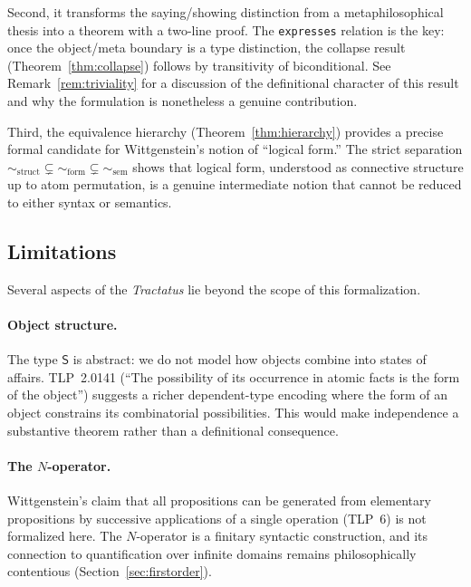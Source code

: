 \documentclass[10pt, letterpaper]{article}
\theoremstyle{definition}
\theoremstyle{remark}
\newcommand{\Sach}{\mathsf{S}}
\newcommand{\structEq}{\sim_{\mathrm{struct}}}
\newcommand{\formEq}{\sim_{\mathrm{form}}}
\newcommand{\semEq}{\sim_{\mathrm{sem}}}
\begin{document}
Second, it transforms the saying/showing distinction from a
metaphilosophical thesis into a theorem with a two-line proof.
The \texttt{expresses} relation is the key: once the
object/meta boundary is a type distinction, the collapse result
(Theorem~\ref{thm:collapse}) follows by transitivity of
biconditional.  See Remark~\ref{rem:triviality} for a
discussion of the definitional character of this result and
why the formulation is nonetheless a genuine contribution.

Third, the equivalence hierarchy (Theorem~\ref{thm:hierarchy})
provides a precise formal candidate for Wittgenstein's
notion of ``logical form.''  The strict separation $\structEq
\subsetneq \formEq \subsetneq \semEq$ shows that logical form,
understood as connective structure up to atom permutation, is a
genuine intermediate notion that cannot be reduced to either
syntax or semantics.

\subsection{Limitations}
\label{sec:limitations}

Several aspects of the \emph{Tractatus} lie beyond the scope of
this formalization.

\paragraph{Object structure.}
The type $\Sach$ is abstract: we do not model how objects combine
into states of affairs.  TLP~2.0141 (``The possibility of its
occurrence in atomic facts is the form of the object'') suggests
a richer dependent-type encoding where the form of an object
constrains its combinatorial possibilities.  This would make
independence a substantive theorem rather than a definitional
consequence.

\paragraph{The $N$-operator.}
Wittgenstein's claim that all propositions can be generated from
elementary propositions by successive applications of a single
operation (TLP~6) is not formalized here.  The $N$-operator is
a finitary syntactic construction, and its connection to
quantification over infinite domains remains philosophically
contentious (Section~\ref{sec:firstorder}).
\end{document}
